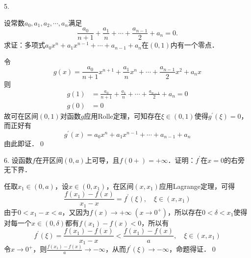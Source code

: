 5. \begin{minipage}[t]{0.8\textwidth}
设常数$a_0,a_1,a_2,\cdots, a_n$满足
\begin{equation*}
    \frac{a_0}{n+1}+\frac{a_1}{n}+\cdots +\frac{a_{n-1}}{2}+a_n = 0.
\end{equation*}
求证：多项式$a_0 x^n + a_1 x^{n-1} + \cdots + a_{n-1} + a_n$在$(0,1)$内有一个零点．
\end{minipage}
\bigskip

\prove 令
\begin{equation}
    g(x) = \frac{a_0}{n+1} x^{n+1} + \frac{a_1}{n} x^n + \cdots + \frac{a_{n-1}}{2} x^2 + a_n x
\end{equation}
则
\begin{align}
    g(1) &= \frac{a_0}{n+1}+\frac{a_1}{n}+\cdots +\frac{a_{n-1}}{2}+a_n = 0 \\
    g(0) &= 0
\end{align}
故可在区间$(0,1)$对函数$g$应用Rolle定理，可知存在$\xi \in (0,1)$使得$g^{\prime}(\xi)=0$，而正好有
\begin{equation}
    g^{\prime}(x) = a_0 x^n + a_1 x^{n-1} + \cdots + a_{n-1} + a_n
\end{equation}
由此即证．\qed\bigskip

6. 设函数$f$在开区间$(0,a)$上可导，且$f(0+)=+\infty$．证明：$f^\prime$在$x=0$的右旁无下界．

\prove 任取$x_1 \in (0,a)$，设$x \in (0, x_1)$，在区间$(x,x_1)$应用Lagrange定理，可得
\begin{equation}
    \frac{f(x_1)-f(x)}{x_1-x} = f^{\prime}(\xi), \quad \xi \in (x, x_1)
\end{equation}
由于$0 < x_1-x < a$，又因为$f(x) \to +\infty \; (x \to 0^+)$，所以存在$0<\delta<x_1$使得对每一个$x \in (0,\delta)$都有$f(x_1)-f(x)<0$，所以有
\begin{equation}
    f^{\prime}(\xi) = \frac{f(x_1)-f(x)}{x_1-x} < \frac{f(x_1)-f(x)}{a}, \quad \xi \in (x, x_1)
\end{equation}
令$x \to 0^+$，则$\displaystyle\frac{f(x_1)-f(x)}{a} \to -\infty$，从而$f^{\prime}(\xi) \to -\infty$，命题得证．\qed\bigskip